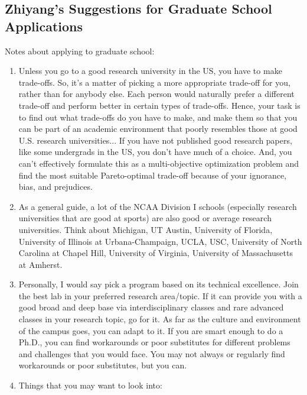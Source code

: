 \subsection{\hspace{0.1in} Zhiyang's Suggestions for Graduate School Applications}
\label{zygradschapps}

Notes about applying to graduate school: \vspace{-0.3cm}
\begin{enumerate} \itemsep -4pt
\item Unless you go to a good research university in the US, you have to make trade-offs. So, it's a matter of picking a more appropriate trade-off for you, rather than for anybody else. Each person would naturally prefer a different trade-off and perform better in certain types of trade-offs. Hence, your task is to find out what trade-offs do you have to make, and make them so that you can be part of an academic environment that poorly resembles those at good U.S. research universities...  If you have not published good research papers, like some undergrads in the US, you don't have much of a choice. And, you can't effectively formulate this as a multi-objective optimization problem and find the most suitable Pareto-optimal trade-off because of your ignorance, bias, and prejudices.
\item As a general guide, a lot of the NCAA Division I schools (especially research universities that are good at sports) are also good or average research universities. Think about Michigan, UT Austin, University of Florida, University of Illinois at Urbana-Champaign, UCLA, USC, University of North Carolina at Chapel Hill, University of Virginia, University of Massachusetts at Amherst.
\item Personally, I would say pick a program based on its technical excellence. Join the best lab in your preferred research area/topic. If it can provide you with a good broad and deep base via interdisciplinary classes and rare advanced classes in your research topic, go for it. As far as the culture and environment of the campus goes, you can adapt to it. If you are smart enough to do a Ph.D., you can find workarounds or poor substitutes for different problems and challenges that you would face. You may not always or regularly find workarounds or poor substitutes, but you can.
\item Things that you may want to look into: \vspace{-0.3cm}
	\begin{enumerate} \itemsep -2pt

\end{enumerate}
\end{enumerate}
